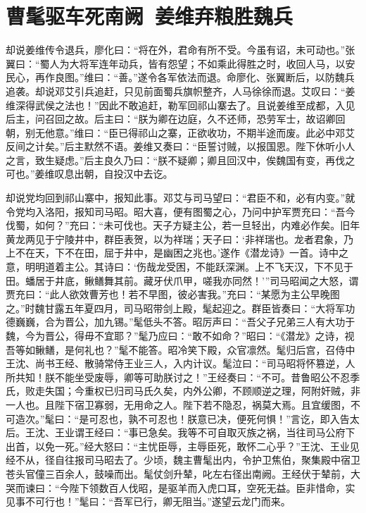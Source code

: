 \chapter{曹髦驱车死南阙~姜维弃粮胜魏兵}

却说姜维传令退兵，廖化曰：“将在外，君命有所不受。今虽有诏，未可动也。”张翼曰：“蜀人为大将军连年动兵，皆有怨望；不如乘此得胜之时，收回人马，以安民心，再作良图。”维曰：“善。”遂令各军依法而退。命廖化、张翼断后，以防魏兵追袭。却说邓艾引兵追赶，只见前面蜀兵旗帜整齐，人马徐徐而退。艾叹曰：“姜维深得武侯之法也！”因此不敢追赶，勒军回祁山寨去了。且说姜维至成都，入见后主，问召回之故。后主曰：“朕为卿在边庭，久不还师，恐劳军士，故诏卿回朝，别无他意。”维曰：“臣已得祁山之寨，正欲收功，不期半途而废。此必中邓艾反间之计矣。”后主默然不语。姜维又奏曰：“臣誓讨贼，以报国恩。陛下休听小人之言，致生疑虑。”后主良久乃曰：“朕不疑卿；卿且回汉中，俟魏国有变，再伐之可也。”姜维叹息出朝，自投汉中去讫。

却说党均回到祁山寨中，报知此事。邓艾与司马望曰：“君臣不和，必有内变。”就令党均入洛阳，报知司马昭。昭大喜，便有图蜀之心，乃问中护军贾充曰：“吾今伐蜀，如何？”充曰：“未可伐也。天子方疑主公，若一旦轻出，内难必作矣。旧年黄龙两见于宁陵井中，群臣表贺，以为祥瑞；天子曰：‘非祥瑞也。龙者君象，乃上不在天，下不在田，屈于井中，是幽困之兆也。’遂作《潜龙诗》一首。诗中之意，明明道着主公。其诗曰：‘伤哉龙受困，不能跃深渊。上不飞天汉，下不见于田。蟠居于井底，鳅鳝舞其前。藏牙伏爪甲，嗟我亦同然！’”司马昭闻之大怒，谓贾充曰：“此人欲效曹芳也！若不早图，彼必害我。”充曰：“某愿为主公早晚图之。”时魏甘露五年夏四月，司马昭带剑上殿，髦起迎之。群臣皆奏曰：“大将军功德巍巍，合为晋公，加九锡。”髦低头不答。昭厉声曰：“吾父子兄弟三人有大功于魏，今为晋公，得毋不宜耶？”髦乃应曰：“敢不如命？”昭曰：“《潜龙》之诗，视吾等如鳅鳝，是何礼也？”髦不能答。昭冷笑下殿，众官凛然。髦归后宫，召侍中王沈、尚书王经、散骑常侍王业三人，入内计议。髦泣曰：“司马昭将怀篡逆，人所共知！朕不能坐受废辱，卿等可助朕讨之！”王经奏曰：“不可。昔鲁昭公不忍季氏，败走失国；今重权已归司马氏久矣，内外公卿，不顾顺逆之理，阿附奸贼，非一人也。且陛下宿卫寡弱，无用命之人。陛下若不隐忍，祸莫大焉。且宜缓图，不可造次。”髦曰：“是可忍也，孰不可忍也！朕意已决，便死何惧！”言讫，即入告太后。王沈、王业谓王经曰：“事已急矣。我等不可自取灭族之祸，当往司马公府下出首，以免一死。”经大怒曰：“主忧臣辱，主辱臣死，敢怀二心乎？”王沈、王业见经不从，径自往报司马昭去了。少顷，魏主曹髦出内，令护卫焦伯，聚集殿中宿卫苍头官僮三百余人，鼓噪而出。髦仗剑升辇，叱左右径出南阙。王经伏于辇前，大哭而谏曰：“今陛下领数百人伐昭，是驱羊而入虎口耳，空死无益。臣非惜命，实见事不可行也！”髦曰：“吾军已行，卿无阻当。”遂望云龙门而来。

